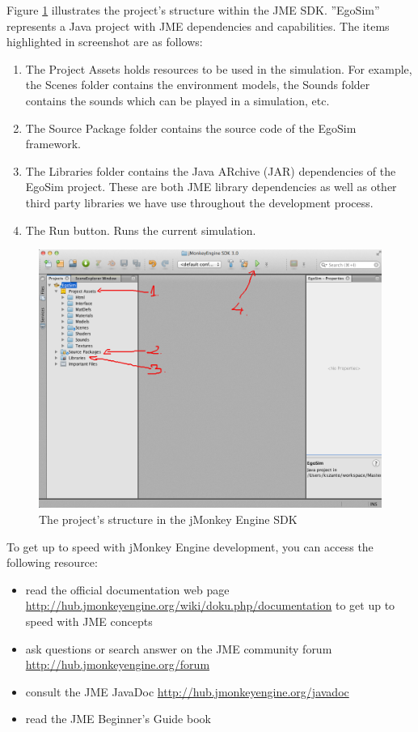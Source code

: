 Figure \ref{fig:egosim_structure} illustrates the project's structure within the JME SDK. ''EgoSim'' represents a Java project with JME dependencies and capabilities. The items highlighted in screenshot are as follows:
\begin{enumerate}
	\item The Project Assets holds resources to be used in the simulation. For example, the Scenes folder contains the environment models, the Sounds folder contains the sounds which can be played in a simulation, etc.
	\item The Source Package folder contains the source code of the EgoSim framework.
	\item The Libraries folder contains the Java ARchive (JAR) dependencies of the EgoSim project. These are both JME library dependencies as well as other third party libraries we have use throughout the development process.
	\item The Run button. Runs the current simulation.
\end{enumerate}

\begin{figure}[H]
	\centering
	\includegraphics[width=\linewidth]{gfx/Chapter4/project_structure_in_sdk}
	\caption{The project's structure in the jMonkey Engine SDK}
	\label{fig:egosim_structure}
\end{figure}

To get up to speed with jMonkey Engine development, you can access the following resource:
\begin{itemize}
	\item read the official documentation web page \url{http://hub.jmonkeyengine.org/wiki/doku.php/documentation} to get up to speed with JME concepts
	\item ask questions or search answer on the JME community forum \url{http://hub.jmonkeyengine.org/forum}
	\item consult the JME JavaDoc \url{http://hub.jmonkeyengine.org/javadoc}
	\item read the JME Beginner's Guide book \cite{kusterer2013jmonkeyengine}
\end{itemize}

